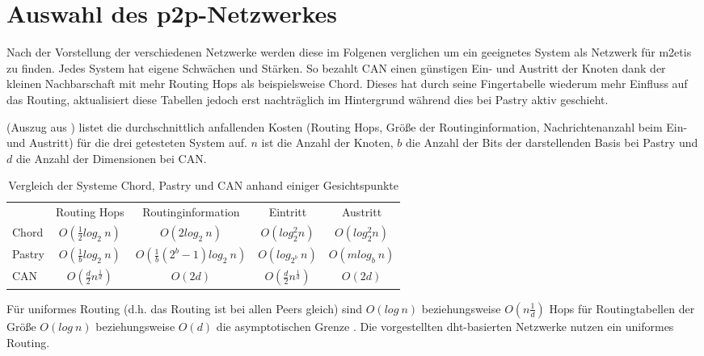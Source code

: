 



\section{Auswahl des p2p-Netzwerkes}
Nach der Vorstellung der verschiedenen Netzwerke werden diese im Folgenen verglichen um ein geeignetes System als Netzwerk für \ac{m2etis} zu finden. Jedes System hat eigene Schwächen und Stärken. So bezahlt CAN einen günstigen Ein- und Austritt der Knoten dank der kleinen Nachbarschaft mit mehr Routing Hops als beispielsweise Chord. Dieses hat durch seine Fingertabelle wiederum mehr Einfluss auf das Routing, aktualisiert diese Tabellen jedoch erst nachträglich im Hintergrund während dies bei Pastry aktiv geschieht.

 (Auszug aus \cite{Goetz2005}) listet die durchschnittlich anfallenden Kosten (Routing Hops, Größe der Routinginformation, Nachrichtenanzahl beim Ein- und Austritt) für die drei getesteten System auf. $n$ ist die Anzahl der Knoten, $b$ die Anzahl der Bits der darstellenden Basis bei Pastry und $d$ die Anzahl der Dimensionen bei CAN.

\begin{table}[htbp]
\centering
\begin{tabular}{lcccc}
\toprule
 & Routing Hops & Routinginformation & Eintritt & Austritt\\ 
 \cmidrule{2-5}
Chord & $O(\frac{1}{2}log_2~n)$ & $O(2log_2~n) $ & $ O(log_2^2 n) $ & $ O(log_2^2 n) $ \\
Pastry & $O(\frac{1}{b}log_2~n)$ & $O(\frac{1}{b} (2^b-1) log_2~n) $ & $ O(log_{2^b}~n) $ & $ O(mlog_b~n) $ \\
CAN & $O(\frac{d}{2}n^\frac{1}{d})	$ & $O(2 d) $ & $ O(\frac{d}{2}n^\frac{1}{d}) $ & $ O(2 d) $ \\
\bottomrule
\end{tabular}
\caption[Vergleich der Systeme Chord, Pastry und CAN]{Vergleich der Systeme Chord, Pastry und CAN anhand einiger Gesichtspunkte}
\label{tab:evaluation_fazit}
\end{table}

Für uniformes Routing (d.h. das Routing ist bei allen Peers gleich) sind $O(log~n)$ beziehungsweise $O(n\frac{1}{d})$ Hops für Routingtabellen der Größe $O(log~n)$ beziehungsweise $O(d)$ die asymptotischen Grenze \cite{Xu2004Fundamental}. Die vorgestellten \ac{dht}-basierten Netzwerke nutzen ein uniformes Routing.


